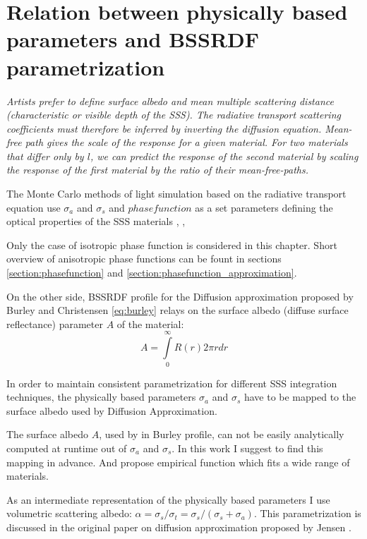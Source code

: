 \section{Relation between physically based parameters and BSSRDF parametrization}
\label{section:cb_parametrization}
\emph{Artists prefer to define surface albedo and mean multiple scattering distance (characteristic
or visible depth of the SSS). The radiative transport scattering coefficients must therefore be
inferred by inverting the diffusion equation.
Mean-free path gives the scale of the response for a given material. For two materials that differ
only by $l$, we can predict the response of the second material by scaling the response of the first
material by the ratio of their mean-free-paths.}


The Monte Carlo methods of light simulation based on the radiative transport equation use $\sigma_a$
and $\sigma_s$ and $phase function$ as a set parameters defining the optical properties of the SSS
materials \cite{chandrasekhar1960radiative}, \cite{pharr2010physically},
\cite{Jensen:2001:PMS:383259.383319}

Only the case of isotropic phase function is considered in this chapter. Short overview of
anisotropic phase functions can be fount in sections \ref{section:phasefunction} and
\ref{section:phasefunction_approximation}.

On the other side, BSSRDF profile for the Diffusion approximation proposed by Burley and Christensen
\ref{eq:burley} relays on the surface albedo (diffuse surface reflectance) parameter $A$ of the
material:
\[
A = \int\limits_0^\infty R(r)2\pi r dr
\]

In order to maintain consistent parametrization for different SSS integration techniques, the
physically based parameters $\sigma_a$ and $\sigma_s$ have to be mapped to the surface albedo used
by Diffusion Approximation.

The surface albedo $A$, used by in Burley profile, can not be easily analytically computed at
runtime out of $\sigma_a$ and $\sigma_s$. In this work I suggest to find this mapping in advance.
And propose empirical function which fits a wide range of materials.

As an intermediate representation of the physically based parameters I use volumetric scattering
albedo: $\alpha = \sigma_s/\sigma_t = \sigma_s/(\sigma_s + \sigma_a)$. This parametrization is
discussed in the original paper on diffusion approximation proposed by Jensen
\cite{Jensen:2001:PMS:383259.383319}.


